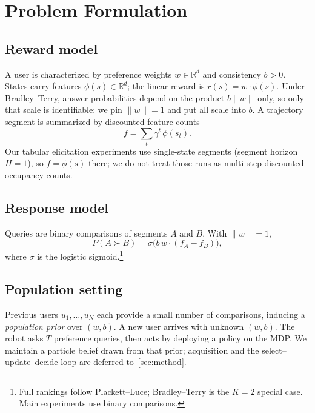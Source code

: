 \section{Problem Formulation}
\label{sec:problem}

\subsection{Reward model}
\label{sec:reward}
A user is characterized by preference weights $w\in\mathbb{R}^d$ and consistency
$b>0$.
States carry features $\phi(s)\in\mathbb{R}^d$; the linear reward is
$r(s)=w\cdot\phi(s)$.
Under Bradley--Terry, answer probabilities depend on the product $b\|w\|$ only, so
only that scale is identifiable: we pin $\|w\|=1$ and put all scale into $b$.
A trajectory segment is summarized by discounted feature counts
\begin{equation}
  f=\sum_{t}\gamma^{t}\,\phi(s_{t}).
\end{equation}
Our tabular elicitation experiments use single-state segments (segment horizon
$H{=}1$), so $f=\phi(s)$ there; we do not treat those runs as multi-step
discounted occupancy counts.

\subsection{Response model}
\label{sec:response}
Queries are binary comparisons of segments $A$ and $B$.
With $\|w\|=1$,
\begin{equation}
  P(A\succ B)=\sigma\bigl(b\,w\cdot(f_A-f_B)\bigr),
\end{equation}
where $\sigma$ is the logistic sigmoid.\footnote{%
Full rankings follow Plackett--Luce; Bradley--Terry is the $K{=}2$ special case.
Main experiments use binary comparisons.}

\subsection{Population setting}
\label{sec:population}
Previous users $u_1,\ldots,u_N$ each provide a small number of comparisons,
inducing a \emph{population prior} over $(w,b)$.
A new user arrives with unknown $(w,b)$.
The robot asks $T$ preference queries, then acts by deploying a policy on the MDP.
We maintain a particle belief drawn from that prior; acquisition and the
select--update--decide loop are deferred to~\cref{sec:method}.

